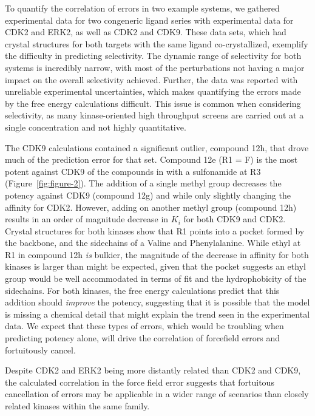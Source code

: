 \documentclass[phd,tocprelim]{cornell}
\begin{document}
To quantify the correlation of errors in two example systems, we gathered experimental data for two congeneric ligand series with experimental data for CDK2 and ERK2, as well as CDK2 and CDK9. These data sets, which had crystal structures for both targets with the same ligand co-crystallized, exemplify the difficulty in predicting selectivity. 
The dynamic range of selectivity for both systems is incredibly narrow, with most of the perturbations not having a major impact on the overall selectivity achieved. 
Further, the data was reported with unreliable experimental uncertainties, which makes quantifying the errors made by the free energy calculations difficult. 
This issue is common when considering selectivity, as many kinase-oriented high throughput screens are carried out at a single concentration and not highly quantitative. 

The CDK9 calculations contained a significant outlier, compound 12h, that drove much of the prediction error for that set. Compound 12e (R1 = F) is the most potent against CDK9 of the compounds in with a sulfonamide at R3 (Figure~\ref{fig:figure-2}). The addition of a single methyl group decreases the potency against CDK9 (compound 12g) and while only slightly changing the affinity for CDK2. However, adding on another methyl group (compound 12h) results in an order of magnitude decrease in $K_i$ for both CDK9 and CDK2. Crystal structures for both kinases show that R1 points into a pocket formed by the backbone, and the sidechains of a Valine and  Phenylalanine. While ethyl at R1 in compound 12h \emph{is} bulkier, the magnitude of the decrease in affinity for both kinases is larger than might be expected, given that the pocket suggests an ethyl group would be well accommodated in terms of fit and the hydrophobicity of the sidechains. For both kinases, the free energy calculations predict that this addition should \emph{improve} the potency, suggesting that it is possible that the model is missing a chemical detail that might explain the trend seen in the experimental data. We expect that these types of errors, which would be troubling when predicting potency alone, will drive the correlation of forcefield errors and fortuitously cancel. 

Despite CDK2 and ERK2 being more distantly related than CDK2 and CDK9, the calculated correlation in the force field error suggests that fortuitous cancellation of errors may be applicable in a wider range of scenarios than closely related kinases within the same family. 
\end{document}
